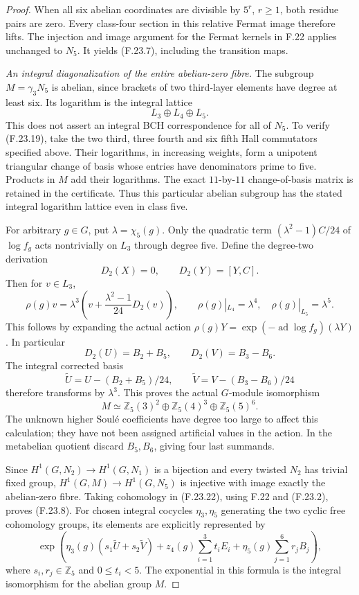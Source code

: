 \begin{proof}
When all six abelian coordinates are divisible by
\(5^r\), \(r\geq1\), both residue pairs are zero.
Every class-four section in this relative Fermat image
therefore lifts. The injection and image argument for
the Fermat kernels in F.22 applies unchanged to \(N_5\).
It yields (F.23.7), including the transition maps.

\emph{An integral diagonalization of the entire abelian-zero fibre.}
The subgroup \(M=\gamma_3N_5\) is abelian, since brackets
of two third-layer elements have degree at least six.
Its logarithm is the integral lattice
\[
                          L_3\oplus L_4\oplus L_5.
                                                               \tag{F.23.19}
\]
This does not assert an integral BCH correspondence for
all of \(N_5\). To verify (F.23.19), take the two third,
three fourth and six fifth Hall commutators specified
above. Their logarithms, in increasing weights, form a
unipotent triangular change of basis whose entries have
denominators prime to five. Products in \(M\) add their
logarithms. The exact \(11\)-by-\(11\) change-of-basis
matrix is retained in the certificate. Thus this
particular abelian subgroup has the stated integral
logarithm lattice even in class five.

For arbitrary \(g\in G\), put \(\lambda=\chi_5(g)\).
Only the quadratic term
\((\lambda^2-1)C/24\) of \(\log f_g\) acts nontrivially
on \(L_3\) through degree five. Define the degree-two
derivation
\[
 D_2(X)=0,\qquad D_2(Y)=[Y,C].
\]
Then for \(v\in L_3\),
\[
 \rho(g)v=\lambda^3
       \left(v+\frac{\lambda^2-1}{24}D_2(v)\right),
 \qquad
 \rho(g)|_{L_4}=\lambda^4,\quad
 \rho(g)|_{L_5}=\lambda^5.                                   \tag{F.23.20}
\]
This follows by expanding the actual action
\(\rho(g)Y=\exp(-\operatorname{ad}\log f_g)(\lambda Y)\).
In particular
\[
 D_2(U)=B_2+B_5,\qquad D_2(V)=B_3-B_6.
\]
The integral corrected basis
\[
        \widetilde U=U-(B_2+B_5)/24,\qquad
        \widetilde V=V-(B_3-B_6)/24                           \tag{F.23.21}
\]
therefore transforms by \(\lambda^3\). This proves the
actual \(G\)-module isomorphism
\[
 M\simeq \mathbb Z_5(3)^2\oplus
          \mathbb Z_5(4)^3\oplus\mathbb Z_5(5)^6 .
                                                               \tag{F.23.22}
\]
The unknown higher Soulé coefficients have degree too
large to affect this calculation; they have not been
assigned artificial values in the action.
In the metabelian quotient discard \(B_5,B_6\), giving
four last summands.

Since \(H^1(G,N_2)\to H^1(G,N_1)\) is a bijection and
every twisted \(N_2\) has trivial fixed group,
\(H^1(G,M)\to H^1(G,N_5)\) is injective with image
exactly the abelian-zero fibre. Taking cohomology in
(F.23.22), using F.22 and (F.23.2), proves (F.23.8).
For chosen integral cocycles \(\eta_3,\eta_5\) generating
the two cyclic free cohomology groups, its elements
are explicitly represented by
\[
 \exp\!\left(
 \eta_3(g)(s_1\widetilde U+s_2\widetilde V)
  +z_4(g)\sum_{i=1}^3t_iE_i
  +\eta_5(g)\sum_{j=1}^6r_jB_j\right),
                                                               \tag{F.23.23}
\]
where \(s_i,r_j\in\mathbb Z_5\) and \(0\leq t_i<5\).
The exponential in this formula is the integral
isomorphism for the abelian group \(M\).


\end{proof}
